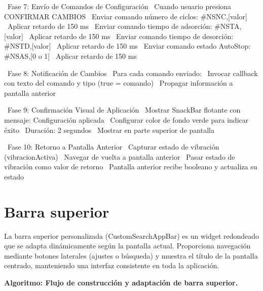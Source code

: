 \begin{algorithmic}[1]
\State~Fase 7: Envío de Comandos de Configuración
\State~Cuando usuario presiona CONFIRMAR CAMBIOS\:
\State~Enviar comando número de ciclos: \#NSNC,[valor]
\State~Aplicar retardo de 150 ms
\State~Enviar comando tiempo de adsorción: \#NSTA,[valor]
\State~Aplicar retardo de 150 ms
\State~Enviar comando tiempo de desorción: \#NSTD,[valor]
\State~Aplicar retardo de 150 ms
\State~Enviar comando estado AutoStop: \#NSAS,[0 o 1]
\State~Aplicar retardo de 150 ms

\State~Fase 8: Notificación de Cambios
\State~Para cada comando enviado:
%
    \State~Invocar callback con texto del comando y tipo (true = comando)
    \State~Propagar información a pantalla anterior
\EndIf%

\State~Fase 9: Confirmación Visual de Aplicación
\State~Mostrar SnackBar flotante con mensaje: Configuración aplicada
\State~Configurar color de fondo verde para indicar éxito
\State~Duración: 2 segundos
\State~Mostrar en parte superior de pantalla

\State~Fase 10: Retorno a Pantalla Anterior
\State~Capturar estado de vibración (vibracionActiva)
\State~Navegar de vuelta a pantalla anterior
\State~Pasar estado de vibración como valor de retorno
\State~Pantalla anterior recibe booleano y actualiza su estado

\end{algorithmic}

\section{Barra superior}

La barra superior personalizada (CustomSearchAppBar) es un widget redondeado que se adapta dinámicamente según la pantalla actual. Proporciona navegación mediante botones laterales (ajustes o búsqueda) y muestra el título de la pantalla centrado, manteniendo una interfaz consistente en toda la aplicación.
\par

\noindent\textbf{Algoritmo: Flujo de construcción y adaptación de barra superior.}

